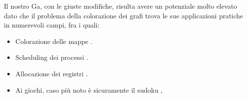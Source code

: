 \vspace{3mm}

Il nostro Ga, con le giuste modifiche, risulta avere un potenziale molto elevato dato che il problema della colorazione dei grafi trova le sue applicazioni pratiche in numerevoli campi, fra i quali:
\begin{itemize}
    \item Colorazione delle mappe \cite{graphcol3}.
    \item Scheduling dei processi \cite{graphcol8}.
    \item Allocazione dei registri \cite{graphcol7}.
    \item Ai giochi, caso pi\`u noto \`e sicuramente il sudoku \cite{graphcol2} \cite{graphcol5},
    \begin{figure}[H]%
        \centering

\end{figure}
\end{itemize}
